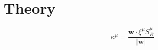 \section{Theory}
\label{sec:theory}

\blindtext

\begin{equation}
    \kappa^\mu = \frac{\mathsf{\bm{w}} \cdotp \xi^\mu S^\mu_R}{\lvert \mathsf{\bm{w}} \rvert}
    \label{eq:perceptron-stability}
\end{equation}